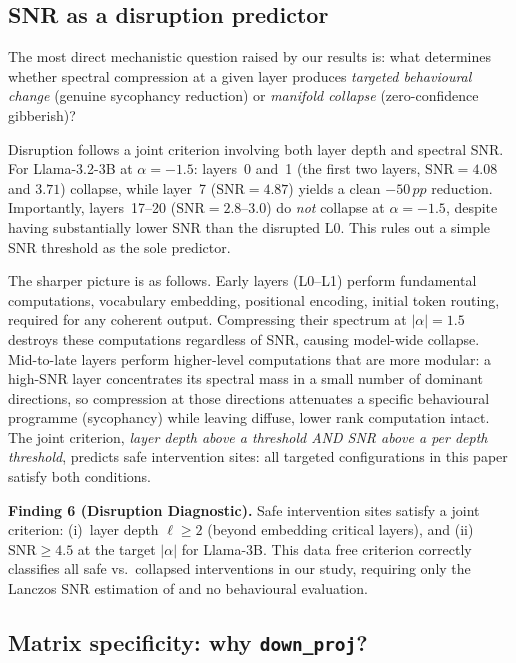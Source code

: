 \documentclass{article}
\newcommand{\snr}{\mathrm{SNR}}
\newcommand{\pp}{\,pp}
\begin{document}
\subsection{SNR as a disruption predictor}
\label{sec:snr_predictor}

The most direct mechanistic question raised by our results is: what
determines whether spectral compression at a given layer produces
\emph{targeted behavioural change} (genuine sycophancy reduction) or
\emph{manifold collapse} (zero-confidence gibberish)?

Disruption follows a joint criterion involving both layer depth and
spectral SNR. For Llama-3.2-3B at $\alpha{=}{-}1.5$: layers~0 and~1
(the first two layers, $\snr = 4.08$ and $3.71$) collapse, while
layer~7 ($\snr = 4.87$) yields a clean $-50\pp$ reduction. Importantly,
layers~17--20 ($\snr = 2.8$--$3.0$) do \emph{not} collapse at
$\alpha{=}{-}1.5$, despite having substantially lower SNR than the
disrupted L0. This rules out a simple SNR threshold as the sole
predictor.

The sharper picture is as follows. Early layers (L0--L1) perform
fundamental computations, vocabulary embedding, positional encoding,
initial token routing, required for any coherent output. Compressing
their spectrum at $|\alpha|{=}1.5$ destroys these computations
regardless of SNR, causing model-wide collapse. Mid-to-late layers
perform higher-level computations that are more modular: a high-SNR
layer concentrates its spectral mass in a small number of dominant
directions, so compression at those directions attenuates a specific
behavioural programme (sycophancy) while leaving diffuse, lower rank
computation intact. The joint criterion, \emph{layer depth above a
threshold AND SNR above a per depth threshold}, predicts safe
intervention sites: all targeted configurations in this paper satisfy
both conditions.

\begin{findingbox}
\textbf{Finding 6 (Disruption Diagnostic).}
Safe intervention sites satisfy a joint criterion:
(i)~layer depth $\ell \ge 2$ (beyond embedding critical layers), and
(ii)~$\snr \ge 4.5$ at the target $|\alpha|$ for Llama-3B.
This data free criterion correctly classifies all safe vs.\ collapsed
interventions in our study, requiring only the Lanczos SNR estimation
of  and no behavioural evaluation.
\end{findingbox}

\subsection{Matrix specificity: why \texttt{down\_proj}?}
\label{sec:matrix_ablation}
\end{document}
